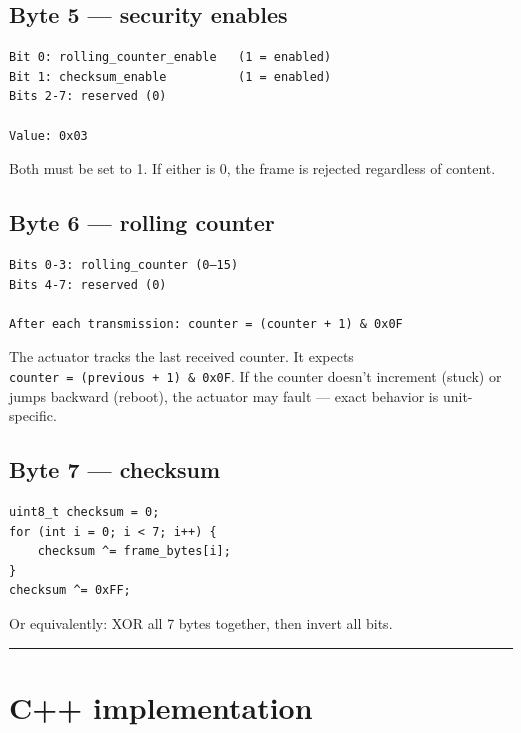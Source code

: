 \documentclass[12pt,a4paper,oneside]{report}
\begin{document}
\subsection{Byte 5 --- security enables}\label{byte-5-security-enables}

\begin{verbatim}
Bit 0: rolling_counter_enable   (1 = enabled)
Bit 1: checksum_enable          (1 = enabled)
Bits 2-7: reserved (0)

Value: 0x03
\end{verbatim}

Both must be set to 1. If either is 0, the frame is rejected regardless of
content.

\subsection{Byte 6 --- rolling counter}\label{byte-6-rolling-counter}

\begin{verbatim}
Bits 0-3: rolling_counter (0–15)
Bits 4-7: reserved (0)

After each transmission: counter = (counter + 1) & 0x0F
\end{verbatim}

The actuator tracks the last received counter. It expects
\texttt{counter\ =\ (previous\ +\ 1)\ \&\ 0x0F}. If the counter doesn't
increment (stuck) or jumps backward (reboot), the actuator may fault --- exact
behavior is unit-specific.

\subsection{Byte 7 --- checksum}\label{byte-7-checksum}

\begin{verbatim}
uint8_t checksum = 0;
for (int i = 0; i < 7; i++) {
    checksum ^= frame_bytes[i];
}
checksum ^= 0xFF;
\end{verbatim}

Or equivalently: XOR all 7 bytes together, then invert all bits.

\begin{center}\rule{0.5\linewidth}{0.5pt}\end{center}

\section{C++ implementation}\label{c-implementation}
\end{document}
